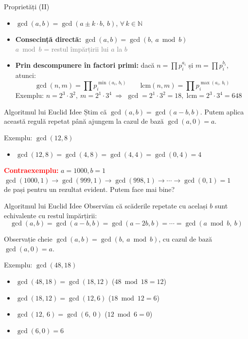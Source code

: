 \documentclass{beamer}
\begin{document}
\begin{frame}{Proprietăți (II)}
  \begin{itemize}
    \item $\gcd(a, b) = \gcd(a \pm k \cdot b,\ b)$, $\forall\, k \in \mathbb{N}$
    \item \textbf{Consecință directă:} $\gcd(a, b) = \gcd(b,\ a \bmod b)$ \\
      {\footnotesize\textcolor{gray}{$a \bmod b$ = restul împărțirii lui $a$ la $b$}}
    \item \textbf{Prin descompunere în factori primi:} dacă
      $n = \prod p_i^{a_i}$ și $m = \prod p_i^{b_i}$, atunci:
      \[
        \gcd(n, m) = \prod p_i^{\min(a_i,\, b_i)} \qquad
        \text{lcm}(n, m) = \prod p_i^{\max(a_i,\, b_i)}
      \]
      Exemplu: $n = 2^3 \cdot 3^2,\ m = 2^1 \cdot 3^4 \;\Rightarrow\;
        \gcd = 2^1 \cdot 3^2 = 18,\;
        \text{lcm} = 2^3 \cdot 3^4 = 648$
  \end{itemize}
\end{frame}

\begin{frame}{Algoritmul lui Euclid \textemdash{} Idee}
  Știm că $\gcd(a, b) = \gcd(a - b, b)$. Putem aplica această regulă repetat până ajungem la cazul de bază $\gcd(a, 0) = a$.
  \bigskip

  Exemplu: $\gcd(12, 8)$
  \begin{itemize}
    \item $\gcd(12, 8) = \gcd(4, 8) = \gcd(4, 4) = \gcd(0, 4) = 4$ \checkmark
  \end{itemize}
  \bigskip

  \begin{block}{\textbf{\textcolor{red}{Contraexemplu:}} $a = 1000, b = 1$}
    $\gcd(1000, 1) \rightarrow \gcd(999, 1) \rightarrow \gcd(998, 1) \rightarrow \cdots \rightarrow \gcd(0, 1) = 1$\\
     de pași pentru un rezultat evident. Putem face mai bine?
  \end{block}
\end{frame}

\begin{frame}{Algoritmul lui Euclid \textemdash{} Idee}
  Observăm că scăderile repetate cu același $b$ sunt echivalente cu restul împărțirii:
  \[
    \gcd(a, b) = \gcd(a - b, b) = \gcd(a - 2b, b) = \cdots = \gcd(a \bmod b,\ b)
  \]
  \begin{block}{Observație cheie}
    $\gcd(a, b) = \gcd(b,\ a \bmod b)$, \quad cu cazul de bază $\gcd(a, 0) = a$.
  \end{block}
  \bigskip
  Exemplu: $\gcd(48, 18)$
  \begin{itemize}
    \item $\gcd(48, 18) = \gcd(18, 12)$ \quad ($48 \bmod 18 = 12$)
    \item $\gcd(18, 12) = \gcd(12, 6)$  \quad ($18 \bmod 12 = 6$)
    \item $\gcd(12,\ 6) = \gcd(6,\ 0)$  \quad\; ($12 \bmod 6 = 0$)
    \item $\gcd(6, 0) = 6$ \checkmark
  \end{itemize}
\end{frame}
\end{document}
